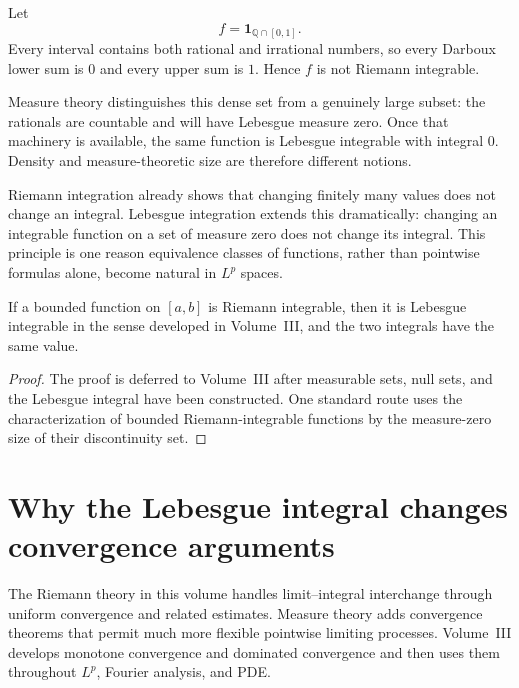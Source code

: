 \begin{example}\label{ex:ii10-lebesgue-bridge-01}
Let
\[
f=\mathbf 1_{\mathbb Q\cap[0,1]}.
\]
Every interval contains both rational and irrational numbers, so every Darboux lower sum is \(0\) and every upper sum is \(1\). Hence \(f\) is not Riemann integrable.

Measure theory distinguishes this dense set from a genuinely large subset: the rationals are countable and will have Lebesgue measure zero. Once that machinery is available, the same function is Lebesgue integrable with integral \(0\). Density and measure-theoretic size are therefore different notions.
\end{example}

\begin{remark}
Riemann integration already shows that changing finitely many values does not change an integral. Lebesgue integration extends this dramatically: changing an integrable function on a set of measure zero does not change its integral. This principle is one reason equivalence classes of functions, rather than pointwise formulas alone, become natural in \(L^p\) spaces.
\end{remark}

\begin{theorem}\label{thm:ii10-riemann-lebesgue-compat}
If a bounded function on \([a,b]\) is Riemann integrable, then it is Lebesgue integrable in the sense developed in Volume~III, and the two integrals have the same value.
\begin{proof}
The proof is deferred to Volume~III after measurable sets, null sets, and the Lebesgue integral have been constructed. One standard route uses the characterization of bounded Riemann-integrable functions by the measure-zero size of their discontinuity set.
\end{proof}
\end{theorem}

\section{Why the Lebesgue integral changes convergence arguments}
The Riemann theory in this volume handles limit--integral interchange through uniform convergence and related estimates. Measure theory adds convergence theorems that permit much more flexible pointwise limiting processes. Volume~III develops monotone convergence and dominated convergence and then uses them throughout \(L^p\), Fourier analysis, and PDE.

